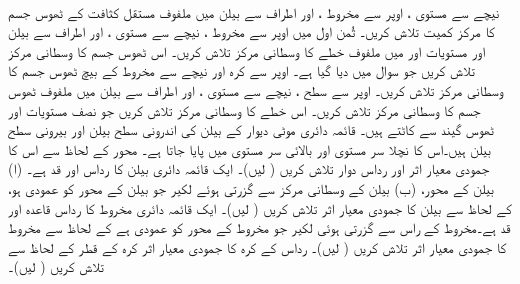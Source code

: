 \\
نیچے سے مستوی ، اوپر سے مخروط ، اور اطراف سے بیلن  میں ملفوف  مستقل کثافت کے ٹھوس جسم کا  مرکز کمیت تلاش کریں۔
ثُمن اول میں اوپر سے مخروط ، نیچے سے مستوی ، اور اطراف سے بیلن  اور مستویات  اور  میں ملفوف  خطے کا وسطانی مرکز تلاش کریں۔
اس ٹھوس جسم کا وسطانی مرکز تلاش کریں جو سوال  میں دیا گیا ہے۔ 
اوپر سے کرہ  اور نیچے سے  مخروط  کے بیچ ٹھوس جسم کا وسطانی مرکز تلاش کریں۔
اوپر سے سطح ، نیچے سے مستوی ، اور اطراف سے  بیلن  میں ملفوف ٹھوس جسم کا وسطانی مرکز تلاش کریں۔
اس خطے کا وسطانی مرکز تلاش کریں جو نصف مستویات  اور  ٹھوس گیند   سے  کاٹتے ہیں۔
قائمہ دائری موٹی دیوار کے  بیلن   کی اندرونی سطح بیلن  اور بیرونی سطح بیلن  ہیں۔اس کا نچلا سر مستوی  اور بالائی سر  مستوی   میں پایا جاتا ہے۔ محور  کے لحاظ سے  اس  کا جمودی معیار اثر اور رداس دوار تلاش کریں ( لیں)۔
ایک قائمہ دائری بیلن کا رداس  اور قد  ہے۔ (ا) بیلن کے محور،  (ب) بیلن کے وسطانی مرکز سے گزرتی ہوئے لکیر جو بیلن کے محور کو عمودی ہو،  کے لحاظ سے بیلن کا جمودی معیار اثر تلاش کریں ( لیں)۔
ایک قائمہ دائری  مخروط کا   رداس قاعدہ   اور قد  ہے۔مخروط کے راس سے گزرتی ہوئی لکیر جو مخروط کے محور کو عمودی ہے کے لحاظ سے مخروط کا جمودی معیار اثر تلاش کریں  ( لیں)۔
رداس  کے کرہ کا جمودی معیار اثر کرہ کے قطر کے لحاظ سے تلاش کریں  ( لیں)۔
